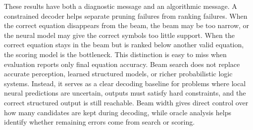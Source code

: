 \documentclass[12pt]{article}
\newcounter{algorithm}
\begin{document}
These results have both a diagnostic message and an algorithmic message. A constrained decoder helps separate pruning failures from ranking failures. When the correct equation disappears from the beam, the beam may be too narrow, or the neural model may give the correct symbols too little support. When the correct equation stays in the beam but is ranked below another valid equation, the scoring model is the bottleneck. This distinction is easy to miss when evaluation reports only final equation accuracy. Beam search does not replace accurate perception, learned structured models, or richer probabilistic logic systems. Instead, it serves as a clear decoding baseline for problems where local neural predictions are uncertain, outputs must satisfy hard constraints, and the correct structured output is still reachable. Beam width gives direct control over how many candidates are kept during decoding, while oracle analysis helps identify whether remaining errors come from search or scoring.

\newpage
\end{document}
